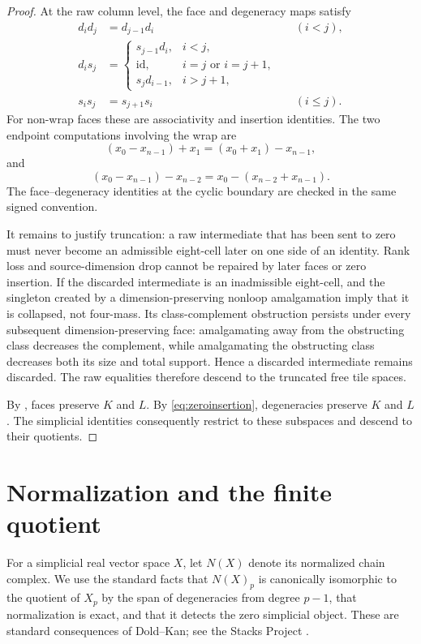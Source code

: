 \documentclass[11pt]{article}
\newcommand{\1}{\mathbf 1}
\begin{document}
\begin{proof}
At the raw column level, the face and degeneracy maps satisfy
\begin{align}
d_i d_j&=d_{j-1}d_i &&(i<j),\label{eq:simp1}\\
d_i s_j&=
\begin{cases}
s_{j-1}d_i,&i<j,\\
\mathrm{id},&i=j\text{ or }i=j+1,\\
s_jd_{i-1},&i>j+1,
\end{cases}\label{eq:simp2}\\
s_i s_j&=s_{j+1}s_i &&(i\le j).\label{eq:simp3}
\end{align}
For non-wrap faces these are associativity and insertion identities.  The
two endpoint computations involving the wrap are
\[
(x_0-x_{n-1})+x_1=(x_0+x_1)-x_{n-1},
\]
and
\[
(x_0-x_{n-1})-x_{n-2}=x_0-(x_{n-2}+x_{n-1}).
\]
The face--degeneracy identities at the cyclic boundary are checked in the
same signed convention.

It remains to justify truncation: a raw intermediate that has been sent to
zero must never become an admissible eight-cell later on one side of an
identity.  Rank loss and source-dimension drop cannot be repaired by later
faces or zero insertion.  If the discarded intermediate is an
inadmissible eight-cell,  and the singleton created by
a dimension-preserving nonloop amalgamation imply that it is collapsed,
not four-mass.  Its class-complement obstruction persists under every
subsequent dimension-preserving face: amalgamating away from the obstructing
class decreases the complement, while amalgamating the obstructing class
decreases both its size and total support.  Hence a discarded intermediate
remains discarded.  The raw equalities therefore descend to the truncated
free tile spaces.

By , faces preserve $K$ and $L$.  By
\eqref{eq:zeroinsertion}, degeneracies preserve $K$ and $L$.  The simplicial
identities consequently restrict to these subspaces and descend to their
quotients.
\end{proof}

\section{Normalization and the finite quotient}
\label{sec:normalization}

For a simplicial real vector space $X$, let $N(X)$ denote its normalized
chain complex.  We use the standard facts that $N(X)_p$ is canonically
isomorphic to the quotient of $X_p$ by the span of degeneracies from degree
$p-1$, that normalization is exact, and that it detects the zero simplicial
object.  These are standard consequences of Dold--Kan; see the Stacks
Project \cite{StacksNorm,StacksExact,StacksDK}.
\end{document}
